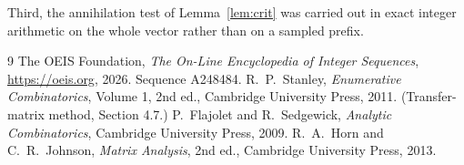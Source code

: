 \documentclass[11pt,a4paper]{article}
\theoremstyle{plain}
\theoremstyle{definition}
\begin{document}
Third, the annihilation test of Lemma~\ref{lem:crit} was carried out in exact integer
arithmetic on the whole vector rather than on a sampled prefix.

\begin{thebibliography}{9}
 The OEIS Foundation, \emph{The On-Line Encyclopedia of Integer
Sequences}, \url{https://oeis.org}, 2026. Sequence A248484.
 R.~P.~Stanley, \emph{Enumerative Combinatorics}, Volume 1, 2nd ed.,
Cambridge University Press, 2011. (Transfer-matrix method, Section 4.7.)
 P.~Flajolet and R.~Sedgewick, \emph{Analytic Combinatorics}, Cambridge
University Press, 2009.
 R.~A.~Horn and C.~R.~Johnson, \emph{Matrix Analysis}, 2nd ed., Cambridge
University Press, 2013.
\end{thebibliography}
\end{document}

